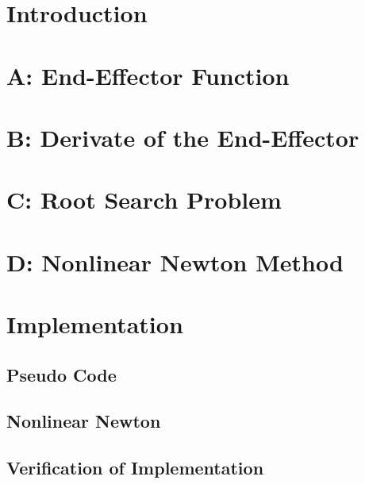 \documentclass[10pt,oneside,a4paper,final,english]{memoir}
\begin{document}




\maketitle
\newpage


\section{Introduction}


\section*{A: End-Effector Function}
\section*{B: Derivate of the End-Effector}
\section*{C: Root Search Problem}
\section*{D: Nonlinear Newton Method}



\section*{Implementation}

\subsection*{Pseudo Code}

\subsection*{Nonlinear Newton}

\subsection*{Verification of Implementation}
\end{document}

